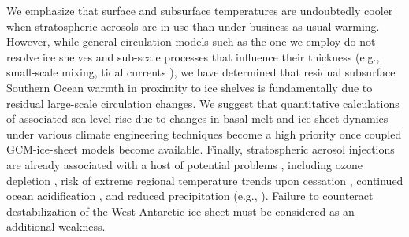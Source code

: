\documentclass{nature}
\begin{document}
We emphasize that surface and subsurface temperatures are undoubtedly cooler when stratospheric aerosols are in use than under business-as-usual warming. However, while general circulation models such as the one we employ do not resolve ice shelves and sub-scale processes that influence their thickness (e.g., small-scale mixing, tidal currents \cite{joughin11}), we have determined that residual subsurface Southern Ocean warmth in proximity to ice shelves is fundamentally due to residual large-scale circulation changes. We suggest that quantitative calculations of associated sea level rise due to changes in basal melt and ice sheet dynamics under various climate engineering techniques become a high priority once coupled GCM-ice-sheet models become available. Finally, stratospheric aerosol injections are already associated with a host of potential problems \cite{robock08c}, including ozone depletion \cite{tilmes08,heckendorn09}, risk of extreme regional temperature trends upon cessation \cite{jones13,mccusker14}, continued ocean acidification \cite{feely04}, and reduced precipitation (e.g., \cite{bala08}). Failure to counteract destabilization of the West Antarctic ice sheet must be considered as an additional weakness. %



\end{document}
